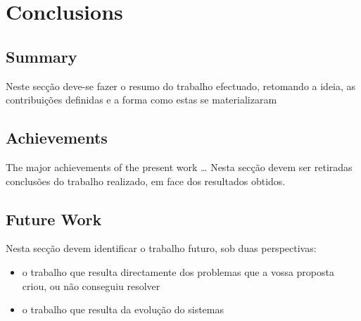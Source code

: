 \chapter{Conclusions}
\label{chapter:conclusion}

\section{Summary}
\label{section:summary}
Neste secção deve-se fazer o resumo do trabalho efectuado, retomando a ideia, as
contribuições definidas e a forma como estas se materializaram

\section{Achievements}
\label{section:achievements}
The major achievements of the present work \ldots
Nesta secção devem ser retiradas conclusões do trabalho realizado, em face dos
resultados obtidos.

\section{Future Work}
\label{section:future}
Nesta secção devem identificar o trabalho futuro, sob duas perspectivas:
\begin{itemize}
\item o trabalho que resulta directamente dos problemas que a vossa proposta criou, ou não conseguiu resolver
\item o trabalho que resulta da evolução do sistemas
\end{itemize}


\cleardoublepage
